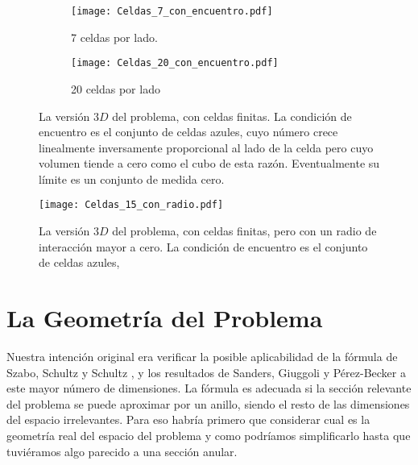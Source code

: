 \documentclass[letterpaperr,12pt]{article}
\begin{document}
\begin{figure}[h]
  \centering
  \begin{subfigure}[b]{0.49\textwidth}
    \centering
    \texttt{[image: Celdas\_7\_con\_encuentro.pdf]}
    \caption{7 celdas por lado.}
    \label{gruesaceldas}
  \end{subfigure}
  \begin{subfigure}[b]{0.49\textwidth}
    \centering
    \texttt{[image: Celdas\_20\_con\_encuentro.pdf]}
    \caption{20 celdas por lado}
    \label{finaceldas}
  \end{subfigure}
  \caption{La versión $3D$ del problema, con celdas finitas. 
La condición de encuentro es el conjunto de celdas azules, cuyo
número crece linealmente inversamente proporcional al lado de la celda pero
cuyo volumen tiende a cero como el cubo de esta razón. Eventualmente 
su límite es un conjunto de medida cero.}\label{celdas3d}
\end{figure}


\begin{figure}[h]
  \centering
   \texttt{[image: Celdas\_15\_con\_radio.pdf]}
   \caption{La versión $3D$ del problema, con celdas finitas, pero
con un radio de interacción mayor a cero. 
La condición de encuentro es el conjunto de celdas azules, }\label{celdas3dconradio}
\end{figure}


\section{La Geometría del Problema}

Nuestra intención original era verificar la posible aplicabilidad de la
fórmula de Szabo, Schultz y Schultz \cite{Szabo80},
 y los resultados de Sanders, Giuggoli y Pérez-Becker  \cite{SandersLuca}
a este mayor número de dimensiones. La fórmula es adecuada si la sección
relevante del problema se puede aproximar por un anillo, 
siendo el resto de las dimensiones del espacio  
irrelevantes. Para eso habría primero que considerar cual es 
la geometría real del espacio del problema y como podríamos simplificarlo
hasta que tuviéramos algo parecido a una sección anular.
\end{document}
